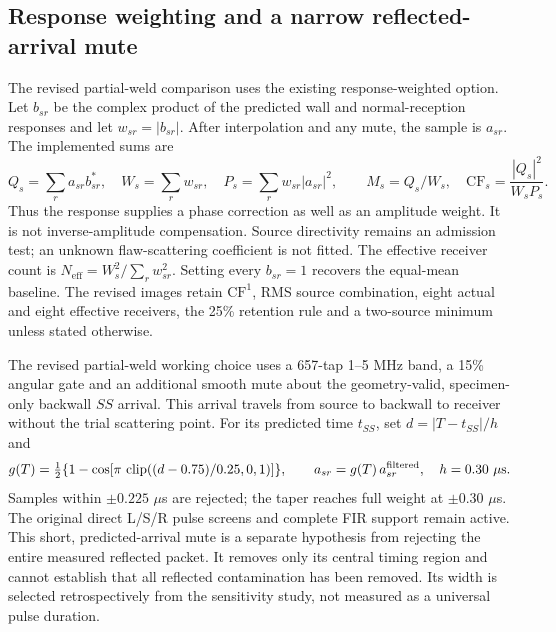 \documentclass[11pt]{article}
\begin{document}
\subsection{Response weighting and a narrow reflected-arrival mute}
The revised partial-weld comparison uses the existing response-weighted option. Let $b_{sr}$ be the complex product of the predicted wall and normal-reception responses and let $w_{sr}=|b_{sr}|$. After interpolation and any mute, the sample is $a_{sr}$. The implemented sums are
\begin{equation}
 Q_s=\sum_r a_{sr}b_{sr}^{*},\quad W_s=\sum_r w_{sr},\quad
 P_s=\sum_r w_{sr}|a_{sr}|^2,\qquad
 M_s=Q_s/W_s,\quad \mathrm{CF}_s=\frac{|Q_s|^2}{W_sP_s}.
\label{saft:weighted}
\end{equation}
Thus the response supplies a phase correction as well as an amplitude weight. It is not inverse-amplitude compensation. Source directivity remains an admission test; an unknown flaw-scattering coefficient is not fitted. The effective receiver count is $N_{\mathrm{eff}}=W_s^2/\sum_r w_{sr}^2$. Setting every $b_{sr}=1$ recovers the equal-mean baseline. The revised images retain $\mathrm{CF}^1$, RMS source combination, eight actual and eight effective receivers, the 25\% retention rule and a two-source minimum unless stated otherwise.

The revised partial-weld working choice uses a 657-tap 1--5 MHz band, a 15\% angular gate and an additional smooth mute about the geometry-valid, specimen-only backwall $SS$ arrival. This arrival travels from source to backwall to receiver without the trial scattering point. For its predicted time $t_{SS}$, set $d=|T-t_{SS}|/h$ and
\begin{equation}
 g(T)=\tfrac12\{1-\cos[\pi\,\operatorname{clip}((d-0.75)/0.25,0,1)]\},
 \qquad a_{sr}=g(T)\,a_{sr}^{\rm filtered},\quad h=0.30\ \mu\mathrm{s}.
\label{saft:mute}
\end{equation}
Samples within $\pm0.225$ $\mu$s are rejected; the taper reaches full weight at $\pm0.30$ $\mu$s. The original direct L/S/R pulse screens and complete FIR support remain active. This short, predicted-arrival mute is a separate hypothesis from rejecting the entire measured reflected packet. It removes only its central timing region and cannot establish that all reflected contamination has been removed. Its width is selected retrospectively from the sensitivity study, not measured as a universal pulse duration.
\end{document}
